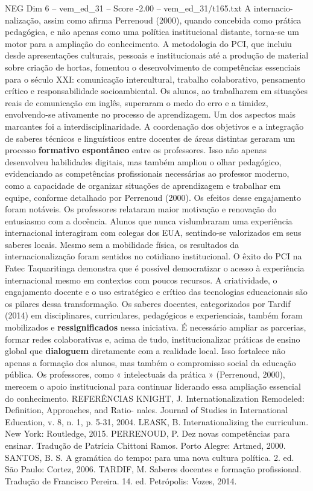 \begin{textsample}{NEG Dim 6 – vem\_ed\_31 – Score -2.00 – vem\_ed\_31/t165.txt}
A internacio- nalização, assim como afirma Perrenoud (2000), quando concebida como prática pedagógica, e não apenas como uma política institucional distante, torna-se um motor para a ampliação do conhecimento.
A metodologia do PCI, que incluiu desde apresentações culturais, pessoais e institucionais até a produção de material sobre criação de hortas, fomentou o desenvolvimento de competências essenciais para o século XXI: comunicação intercultural, trabalho colaborativo, pensamento crítico e responsabilidade socioambiental.
Os alunos, ao trabalharem em situações reais de comunicação em inglês, superaram o medo do erro e a timidez, envolvendo-se ativamente no processo de aprendizagem.
Um dos aspectos mais marcantes foi a interdisciplinaridade.
A coordenação dos objetivos e a integração de saberes técnicos e linguísticos entre docentes de áreas distintas geraram um processo \textbf{formativo} \textbf{espontâneo} entre os professores.
Isso não apenas desenvolveu habilidades digitais, mas também ampliou o olhar pedagógico, evidenciando as competências profissionais necessárias ao professor moderno, como a capacidade de organizar situações de aprendizagem e trabalhar em equipe, conforme detalhado por Perrenoud (2000).
Os efeitos desse engajamento foram notáveis.
Os professores relataram maior motivação e renovação do entusiasmo com a docência.
Alunos que nunca vislumbraram uma experiência internacional interagiram com colegas dos EUA, sentindo-se valorizados em seus saberes locais.
Mesmo sem a mobilidade física, os resultados da internacionalização foram sentidos no cotidiano institucional.
O êxito do PCI na Fatec Taquaritinga demonstra que é possível democratizar o acesso à experiência internacional mesmo em contextos com poucos recursos.
A criatividade, o engajamento docente e o uso estratégico e crítico das tecnologias educacionais são os pilares dessa transformação.
Os saberes docentes, categorizados por Tardif (2014) em disciplinares, curriculares, pedagógicos e experienciais, também foram mobilizados e \textbf{ressignificados} nessa iniciativa.
É necessário ampliar as parcerias, formar redes colaborativas e, acima de tudo, institucionalizar práticas de ensino global que \textbf{dialoguem} diretamente com a realidade local.
Isso fortalece não apenas a formação dos alunos, mas também o compromisso social da educação pública.
Os professores, como « intelectuais da prática » (Perrenoud, 2000), merecem o apoio institucional para continuar liderando essa ampliação essencial do conhecimento.
REFERÊNCIAS KNIGHT, J.
Internationalization Remodeled: Definition, Approaches, and Ratio- nales.
Journal of Studies in International Education, v. 8, n. 1, p. 5-31, 2004.
LEASK, B.
Internationalizing the curriculum.
New York: Routledge, 2015.
PERRENOUD, P.
Dez novas competências para ensinar.
Tradução de Patrícia Chittoni Ramos.
Porto Alegre: Artmed, 2000.
SANTOS, B.
S.
A gramática do tempo: para uma nova cultura política. 2. ed.
São Paulo: Cortez, 2006.
TARDIF, M.
Saberes docentes e formação profissional.
Tradução de Francisco Pereira. 14. ed.
Petrópolis: Vozes, 2014.

\end{textsample}
